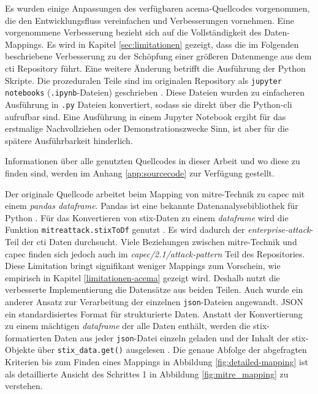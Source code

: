 \par Es wurden einige Anpassungen des verfügbaren \gls{acema}-Quellcodes vorgenommen, die den Entwicklungsfluss vereinfachen und Verbesserungen vornehmen. Eine vorgenommene Verbesserung bezieht sich auf die Vollständigkeit des Daten-Mappings. Es wird in Kapitel \ref{sec:limitationen} gezeigt, dass die im Folgenden beschriebene Verbesserung zu der Schöpfung einer größeren Datenmenge aus dem \gls{cti} Repository führt. Eine weitere Änderung betrifft die Ausführung der Python Skripte. Die prozeduralen Teile sind im originalen Repository als \verb|jupyter notebooks| (\verb|.ipynb|-Dateien) geschrieben \autocite{klement2023acema,ProjectJupyter}. Diese Dateien wurden zu einfacheren Ausführung in \verb|.py| Dateien konvertiert, sodass sie direkt über die Python-\gls{cli} aufrufbar sind. Eine Ausführung in einem Jupyter Notebook ergibt für das erstmalige Nachvollziehen oder Demonstrationszwecke Sinn, ist aber für die spätere Ausführbarkeit hinderlich.
\par Informationen über alle genutzten Quellcodes in dieser Arbeit und wo diese zu finden sind, werden im Anhang \ref{app:sourcecode} zur Verfügung gestellt.

Der originale Quellcode arbeitet beim Mapping von \gls{mitre}-Technik zu \gls{capec} mit einem \textit{pandas dataframe}. Pandas ist eine bekannte Datenanalysebibliothek für Python \autocite{PandasPythonData}. Für das Konvertieren von \gls{stix}-Daten zu einem \textit{dataframe} wird die Funktion \verb|mitreattack.stixToDf| genutzt \autocite{MitreattackpythonMitreattackAttackToExcel,IntroductionSTIX}. Es wird dadurch der \textit{enterprise-attack}-Teil der \gls{cti} Daten durchsucht. Viele Beziehungen zwischen \gls{mitre}-Technik und \gls{capec} finden sich jedoch auch im \textit{capec/2.1/attack-pattern} Teil des Repositories. Diese Limitation bringt signifikant weniger Mappings zum Vorschein, wie empirisch in Kapitel \ref{limitationen-acema} gezeigt wird. Deshalb nutzt die verbesserte Implementierung die Datensätze aus beiden Teilen. Auch wurde ein anderer Ansatz zur Verarbeitung der einzelnen \verb|json|-Dateien angewandt. JSON ein standardisiertes Format für strukturierte Daten. Anstatt der Konvertierung zu einem mächtigen \textit{dataframe} der alle Daten enthält, werden die \gls{stix}-formatierten Daten aus jeder \verb|json|-Datei einzeln geladen und der Inhalt der \gls{stix}-Objekte über \verb|stix_data.get()| ausgelesen \autocite{OasisopenCtipythonstix2OASIS}. Die genaue Abfolge der abgefragten Kriterien bis zum Finden eines Mappings in Abbildung \ref{fig:detailed-mapping} ist als detaillierte Ansicht des Schrittes 1 in Abbildung \ref{fig:mitre_mapping} zu verstehen.

